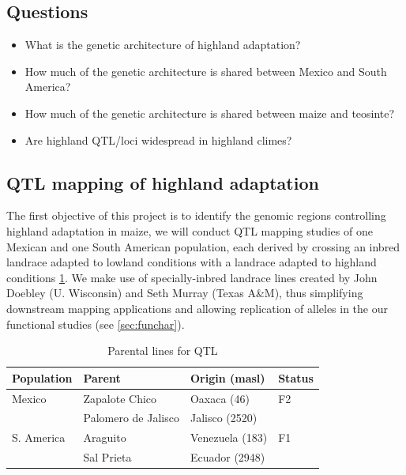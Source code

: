 \subsection*{Questions}
\begin{itemize}[topsep=0pt,itemsep=-1ex,partopsep=1ex,parsep=1ex]
\item What is the genetic architecture of highland adaptation?
\item How much of the genetic architecture is shared between Mexico and South America?
\item How much of the genetic architecture is shared between maize and teosinte?
\item Are highland QTL/loci widespread in highland climes?
\end{itemize}

\subsection{QTL mapping of highland adaptation} \label{subsec:qtlmap}

The first objective of this project is to identify the genomic regions controlling highland adaptation in maize, we will conduct QTL mapping studies of one Mexican and one South American population, each derived by crossing an inbred landrace adapted to lowland conditions with a landrace adapted to highland conditions \ref{tab:qtlpops}.  We make use of specially-inbred landrace lines created by John Doebley (U. Wisconsin) and Seth Murray (Texas A\&M), thus simplifying downstream mapping applications and allowing replication of alleles in the our functional studies (see \ref{sec:funchar}). 

\begin{table}
\begin{center}
\caption{Parental lines for QTL} \label{tab:qtlpops}
\begin{tabular}{llll}\\\toprule  
{\bf Population}	& {\bf Parent } &	{\bf Origin (masl)} & {\bf Status }\\ \midrule
 \rowcolor{gray!25}
Mexico	& Zapalote Chico		& Oaxaca	 (46)		&  F2 \\ 
 \rowcolor{gray!25}
	& 	Palomero de Jalisco	& 	Jalisco (2520)		& \\
S. America	& Araguito	& Venezuela (183)	&  F1 \\ 
	& Sal Prieta	 & Ecuador (2948) & \\ \bottomrule
\end{tabular}
\end{center}
\end{table} 

